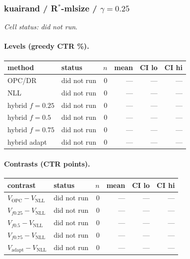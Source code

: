 \documentclass[10pt,a4paper]{article}
\begin{document}
\subsubsection{kuairand / R$^*$-mlsize / $\gamma=0.25$}
\emph{Cell status: did not run}.
\paragraph{Levels (greedy CTR \%).}
{\centering\small\begin{tabular}{llrrrr}
\toprule method & status & $n$ & mean & CI lo & CI hi \\
\midrule
OPC/DR & did not run & 0 & --- & --- & --- \\
NLL & did not run & 0 & --- & --- & --- \\
hybrid $f{=}0.25$ & did not run & 0 & --- & --- & --- \\
hybrid $f{=}0.5$ & did not run & 0 & --- & --- & --- \\
hybrid $f{=}0.75$ & did not run & 0 & --- & --- & --- \\
hybrid adapt & did not run & 0 & --- & --- & --- \\
\bottomrule\end{tabular}\par}
\paragraph{Contrasts (CTR points).}
{\centering\small\begin{tabular}{llrrrr}
\toprule contrast & status & $n$ & mean & CI lo & CI hi \\
\midrule
$V_{\mathrm{OPC}}-V_{\mathrm{NLL}}$ & did not run & 0 & --- & --- & --- \\
$V_{f0.25}-V_{\mathrm{NLL}}$ & did not run & 0 & --- & --- & --- \\
$V_{f0.5}-V_{\mathrm{NLL}}$ & did not run & 0 & --- & --- & --- \\
$V_{f0.75}-V_{\mathrm{NLL}}$ & did not run & 0 & --- & --- & --- \\
$V_{\mathrm{adapt}}-V_{\mathrm{NLL}}$ & did not run & 0 & --- & --- & --- \\
\bottomrule\end{tabular}\par}
\end{document}
